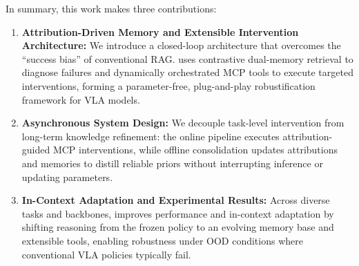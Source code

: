 In summary, this work makes three contributions:
\begin{enumerate}
    \item \textbf{Attribution-Driven Memory and Extensible Intervention Architecture:}
    We introduce a closed-loop architecture that overcomes the ``success bias'' of conventional RAG.\@ {\sys} uses contrastive dual-memory retrieval to diagnose failures and dynamically orchestrated MCP tools to execute targeted interventions, forming a parameter-free, plug-and-play robustification framework for VLA models.
    
    \item \textbf{Asynchronous System Design:}
    We decouple task-level intervention from long-term knowledge refinement: the online pipeline executes attribution-guided MCP interventions, while offline consolidation updates attributions and memories to distill reliable priors without interrupting inference or updating parameters.
    
    \item \textbf{In-Context Adaptation and Experimental Results:}
    Across diverse tasks and backbones, {\sys} improves performance and in-context adaptation by shifting reasoning from the frozen policy to an evolving memory base and extensible tools, enabling robustness under OOD conditions where conventional VLA policies typically fail.
    
\end{enumerate}



\endinput
